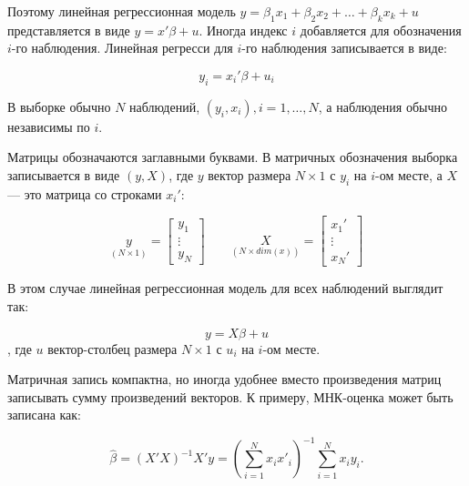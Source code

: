 Поэтому линейная регрессионная модель $y=\beta_{1}x_{1}+\beta_{2}x_{2}+\ldots +\beta_{k}x_{k}+u$ представляется в виде $y=x'\beta+u$. Иногда индекс $i$ добавляется для обозначения $i$-го наблюдения. Линейная регресси для $i$-го наблюдения записывается в виде:

\[
y_{i}=x_{i}'\beta+u_{i}
\]

В выборке обычно $N$ наблюдений, ${(y_{i}, x_{i}), i=1,\ldots ,N}$, а наблюдения обычно независимы по $i$.

Матрицы обозначаются заглавными буквами. В матричных обозначения выборка записывается в виде $(y,X)$, где $y$ вектор размера $ N \times 1 $ с $y_{i}$ на $i$-ом месте, а $X$ --- это матрица со строками $x_{i}'$:

\[
\underset{(N\times1)}{y} = \begin{bmatrix} y_{1} \\ \vdots \\ y_{N} \end{bmatrix} \qquad 
\underset{(N\times dim(x))}{X} = \begin{bmatrix} x_{1}' \\ \vdots \\ x_{N}' \end{bmatrix}
\]

В этом случае линейная регрессионная модель для всех наблюдений выглядит так:

\[
y=X\beta+u
\]
,
где $u$ вектор-столбец размера $ N \times 1 $ с $u_{i}$ на $i$-ом месте.

Матричная запись компактна, но иногда удобнее вместо произведения матриц записывать сумму произведений векторов. К примеру,  МНК-оценка может быть записана как:

\[
\hat{\beta}=(X'X)^{-1}X'y=\left(\sum_{i=1}^N x_i x'_i\right)^{-1}\sum_{i=1}^N x_i y_i.
\]
	
